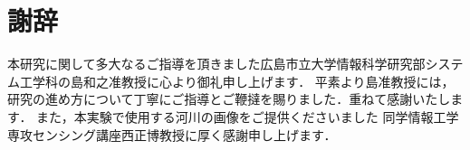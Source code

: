 \newpage
{}
\section*{謝辞}
本研究に関して多大なるご指導を頂きました広島市立大学情報科学研究部システム工学科の島和之准教授に心より御礼申し上げます．
平素より島准教授には，研究の進め方について丁寧にご指導とご鞭撻を賜りました．重ねて感謝いたします．
また，本実験で使用する河川の画像をご提供くださいました
同学情報工学専攻センシング講座西正博教授に厚く感謝申し上げます．

